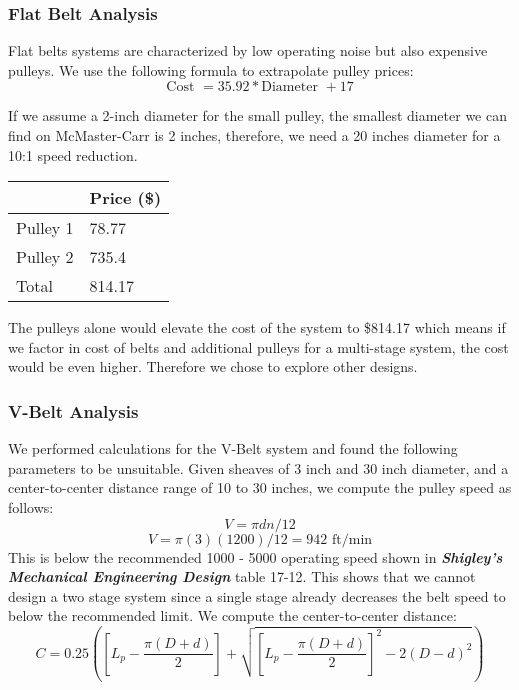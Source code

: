 \documentclass[letterpaper,12pt]{article}
\begin{document}
\subsubsection{Flat Belt Analysis}
Flat belts systems are characterized by low operating noise but also  expensive pulleys. We use the following formula to extrapolate pulley prices:
\begin{equation}
\text{Cost }=35.92 * \text{Diameter }+17
\end{equation}

If we assume a 2-inch diameter for the small pulley, the smallest diameter we can find on McMaster-Carr is 2 inches, therefore, we need a 20 inches diameter for a 10:1 speed reduction. 
\begin{center}
	\begin{tabular}{ |p{3cm}|p{4cm}| }
		\hline
		& Price (\$) \\
		\hline
		Pulley 1 & 78.77\\
		\hline
		Pulley 2 & 735.4\\
		\hline
		Total & 814.17\\
		\hline
	\end{tabular}
\end{center}

The pulleys alone would elevate the cost of the system to \$814.17 which means if we factor in cost of belts and additional pulleys for a multi-stage system, the cost would be even higher. Therefore we chose to explore other designs.

\subsubsection{V-Belt Analysis}
We performed calculations for the V-Belt system and found the following parameters to be unsuitable. Given sheaves of 3 inch and 30 inch diameter, and a center-to-center distance range of 10 to 30 inches, we compute the pulley speed as follows:
\begin{equation}
    V = \pi dn/12
\end{equation}
$$V = \pi(3)(1200)/12 = 942 \text{ ft/min}$$
This is below the recommended 1000 - 5000 operating speed shown in \textbf{\textit{Shigley's Mechanical Engineering Design}} table 17-12. This shows that we cannot design a two stage system since a single stage already decreases the belt speed to below the recommended limit. 
We compute the center-to-center distance:
\begin{equation}
    C = 0.25 \left(\left[L_p - \frac{\pi(D+d)}{2}\right]+\sqrt{\left[L_p - \frac{\pi(D+d)}{2}\right]^2-2(D-d)^2}\right)
\end{equation}
\end{document}
